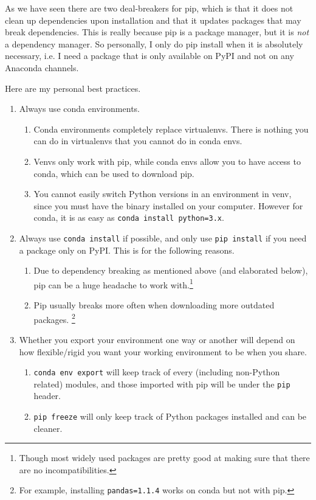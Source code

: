 \documentclass{article}
\begin{document}
    As we have seen there are two deal-breakers for pip, which is that it does not clean up dependencies upon installation and that it updates packages that may break dependencies. This is really because pip is a package manager, but it is \textit{not} a dependency manager. So personally, I only do pip install when it is absolutely necessary, i.e. I need a package that is only available on PyPI and not on any Anaconda channels. 

    \begin{theorem}
      Here are my personal best practices. 
      \begin{enumerate}
        \item Always use conda environments. 
          \begin{enumerate}
            \item Conda environments completely replace virtualenvs. There is nothing you can do in virtualenvs that you cannot do in conda envs. 
            \item Venvs only work with pip, while conda envs allow you to have access to conda, which can be used to download pip. 
            \item You cannot easily switch Python versions in an environment in venv, since you must have the binary installed on your computer. However for conda, it is as easy as \texttt{conda install python=3.x}. 
          \end{enumerate}
        \item Always use \texttt{conda install} if possible, and only use \texttt{pip install} if you need a package only on PyPI. This is for the following reasons. 
          \begin{enumerate}
            \item Due to dependency breaking as mentioned above (and elaborated below), pip can be a huge headache to work with.\footnote{Though most widely used packages are pretty good at making sure that there are no incompatibilities.} 
            \item Pip usually breaks more often when downloading more outdated packages. \footnote{For example, installing \texttt{pandas=1.1.4} works on conda but not with pip. }
          \end{enumerate}

          \item Whether you export your environment one way or another will depend on how flexible/rigid you want your working environment to be when you share. 
            \begin{enumerate}
              \item \texttt{conda env export} will keep track of every (including non-Python related) modules, and those imported with pip will be under the \texttt{pip} header. 
              \item \texttt{pip freeze} will only keep track of Python packages installed and can be cleaner. 
            \end{enumerate}
      \end{enumerate}
    \end{theorem}
\end{document}
